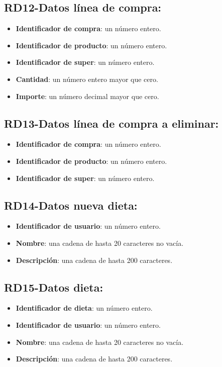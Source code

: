 \documentclass[a4paper,12pt]{report}
\begin{document}
\subsection{RD12-Datos línea de compra:}
\label{sec-2-1-12}
\begin{itemize}
\item \textbf{Identificador de compra}: un número entero.
\item \textbf{Identificador de producto}: un número entero.
\item \textbf{Identificador de super}: un número entero.
\item \textbf{Cantidad}: un número entero mayor que cero.
\item \textbf{Importe}: un número decimal mayor que cero.
\end{itemize}
\subsection{RD13-Datos línea de compra a eliminar:}
\label{sec-2-1-13}
\begin{itemize}
\item \textbf{Identificador de compra}: un número entero.
\item \textbf{Identificador de producto}: un número entero.
\item \textbf{Identificador de super}: un número entero.
\end{itemize}
\subsection{RD14-Datos nueva dieta:}
\label{sec-2-1-14}
\begin{itemize}
\item \textbf{Identificador de usuario}: un número entero.
\item \textbf{Nombre}: una cadena de hasta 20 caracteres no vacía.
\item \textbf{Descripción}: una cadena de hasta 200 caracteres.
\end{itemize}
\subsection{RD15-Datos dieta:}
\label{sec-2-1-15}
\begin{itemize}
\item \textbf{Identificador de dieta}: un número entero.
\item \textbf{Identificador de usuario}: un número entero.
\item \textbf{Nombre}: una cadena de hasta 20 caracteres no vacía.
\item \textbf{Descripción}: una cadena de hasta 200 caracteres.
\end{itemize}
\end{document}
